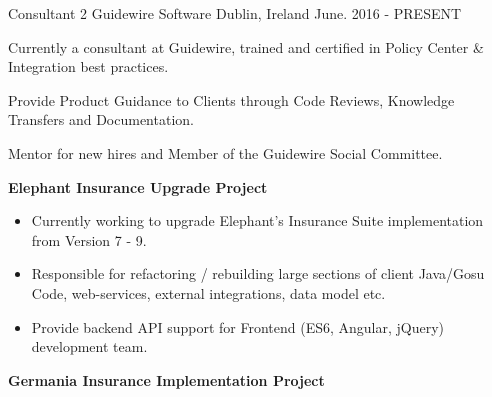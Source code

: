 \begin{cventries}
   \cventry
    {Consultant 2} %
    {Guidewire Software} %
    {Dublin, Ireland} %
    {June. 2016 - PRESENT} %
    {
    \begin{cvitems} %
     	\item {Currently a consultant at Guidewire, trained and certified in Policy Center \& Integration best practices.}
     	\item {Provide Product Guidance to Clients through Code Reviews, Knowledge Transfers and Documentation.}
     	\item {Mentor for new hires and Member of the Guidewire Social Committee.{~\vskip 0.05in}}
       {\textbf{Elephant Insurance Upgrade Project}\hfill{}
         \begin{itemize}
		       \item {Currently working to upgrade Elephant's Insurance Suite implementation from Version 7 - 9.}
		       \item {Responsible for refactoring / rebuilding large sections of client Java/Gosu Code, web-services, external integrations, data model etc.}
		       \item {Provide backend API support for Frontend (ES6, Angular, jQuery) development team.}{~\vskip 0.05in}
         \end{itemize}}
      {\textbf{Germania Insurance Implementation Project}\hfill{}}
\end{cvitems}}
\end{cventries}
